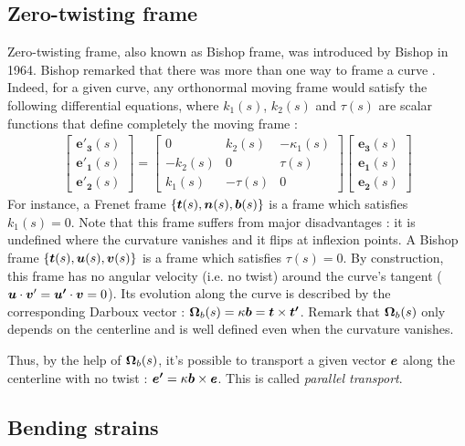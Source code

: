 \subsection{Zero-twisting frame}
Zero-twisting frame, also known as Bishop frame, was introduced by Bishop in 1964. Bishop remarked that there was more than one way to frame a curve \cite{Bishop1975}. Indeed, for a given curve, any orthonormal moving frame would satisfy the following differential equations, where $k_1(s)$, $k_2 (s)$ and $\tau(s)$ are scalar functions that define completely the moving frame :
\begin{gather}
\left[\begin{array}{c}
\mathbf{e'_{3}}(s) \\
\mathbf{e'_{1}}(s) \\
\mathbf{e'_{2}}(s)
\end{array}\right]
=
\left[\begin{array}{ccc}
0 & k_{2}(s) & -\kappa_{1}(s) \\
-k_{2}(s) & 0 & \tau(s) \\
k_{1}(s) & -\tau(s) & 0
\end{array}\right]
\left[\begin{array}{c}
\mathbf{e_{3}}(s) \\
\mathbf{e_{1}}(s) \\
\mathbf{e_{2}}(s)
\end{array}\right]
\end{gather}
For instance, a Frenet frame $\{\boldsymbol{t}(s),\boldsymbol{n}(s),\boldsymbol{b}(s)\}$ is a frame which satisfies $k_1(s)=0$. Note that this frame suffers from major disadvantages : it is undefined where the curvature vanishes and it flips at inflexion points.
A Bishop frame $\{\boldsymbol{t}(s),\boldsymbol{u}(s),\boldsymbol{v}(s)\}$ is a frame which satisfies $\tau(s)=0$. By construction, this frame has no angular velocity (i.e. no twist) around the curve’s tangent ($\boldsymbol{u}\cdot\boldsymbol{v}' = \boldsymbol{u'}\cdot\boldsymbol{v}=0$). Its evolution along the curve is described by the corresponding Darboux vector : $\boldsymbol{\Omega}_b(s)=\kappa\boldsymbol{b}=\boldsymbol{t}\times\boldsymbol{t'}$. Remark that $\boldsymbol{\Omega}_b(s)$ only depends on the centerline and is well defined even when the curvature vanishes.

Thus, by the help of $\boldsymbol{\Omega}_b(s)$, it’s possible to transport a given vector $\boldsymbol{e}$ along the centerline with no twist : $\boldsymbol{e'}=\kappa\boldsymbol{b}\times\boldsymbol{e}$. This is called \emph{parallel transport}.

\subsection{Bending strains}

